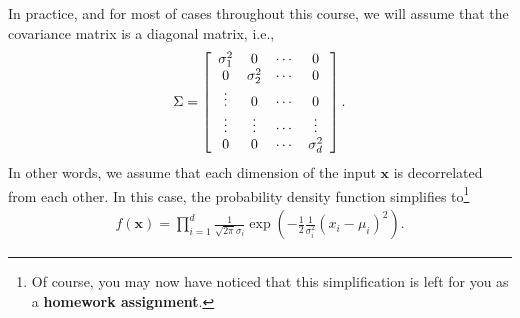 \documentclass{report}
\newcommand{\vect}[1]{\mathbf{#1}}
\newcommand{\vx}[0]{\vect{x}}
\begin{document}
In practice, and for most of cases throughout this course, we will assume that
the covariance matrix is a diagonal matrix, i.e.,
\begin{align*}
    \Sigma = \left[
        \begin{array}{c c c c}
            \sigma_1^2 & 0 & \cdots & 0 \\
            0 & \sigma_2^2 & \cdots & 0 \\
            \vdots & 0 & \cdots & 0 \\
            \vdots & \vdots & \cdots & \vdots \\
            0 & 0 & \cdots & \sigma_d^2 
        \end{array}
    \right].
\end{align*}
In other words, we assume that each dimension of the input $\vx$ is decorrelated
from each other. In this case, the probability density function simplifies
to\footnote{
    Of course, you may now have noticed that this simplification is left for you
    as a {\bf homework assignment}. 
}
\begin{align}
    \label{eq:gauss_pdf_diag}
    f(\vx) = \prod_{i=1}^d 
    \frac{1}{\sqrt{2\pi} \sigma_i}
    \exp\left(
        -\frac{1}{2} \frac{1}{\sigma_i^2}(x_i - \mu_i)^2
    \right).
\end{align}
\end{document}
